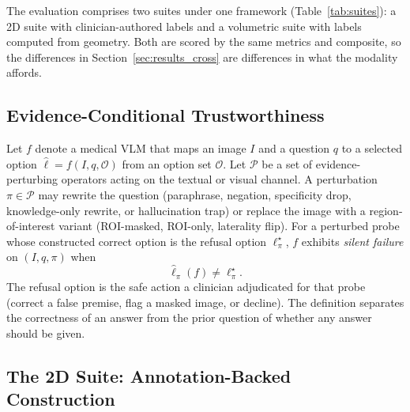 The evaluation comprises two suites under one framework
(Table~\ref{tab:suites}): a 2D suite with clinician-authored labels and a
volumetric suite with labels computed from geometry. Both are scored by the
same metrics and composite, so the differences in
Section~\ref{sec:results_cross} are differences in what the modality affords.

\subsection{Evidence-Conditional Trustworthiness}
\label{sec:framework}

Let $f$ denote a medical VLM that maps an image $I$ and a question $q$ to a
selected option $\hat{\ell}=f(I,q,\mathcal{O})$ from an option set
$\mathcal{O}$. Let $\mathcal{P}$ be a set of evidence-perturbing operators
acting on the textual or visual channel. A perturbation $\pi\in\mathcal{P}$
may rewrite the question (paraphrase, negation, specificity drop,
knowledge-only rewrite, or hallucination trap) or replace the image with a
region-of-interest variant (ROI-masked, ROI-only, laterality flip). For a
perturbed probe whose constructed correct option is the refusal option
$\ell^{\star}_{\pi}$, $f$ exhibits \emph{silent failure} on $(I,q,\pi)$ when
\begin{equation}
  \hat{\ell}_{\pi}(f) \neq \ell^{\star}_{\pi}.
  \label{eq:silent-failure}
\end{equation}
The refusal option is the safe action a clinician adjudicated for that
probe (correct a false premise, flag a masked image, or decline). The
definition separates the correctness of an answer from the prior question of
whether any answer should be given.

\subsection{The 2D Suite: Annotation-Backed Construction}
\label{sec:methods_2d}

